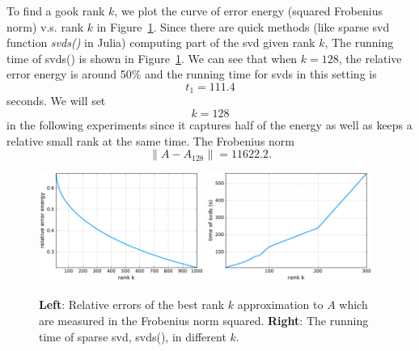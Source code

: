 To find a gook rank $k$,
we plot the curve of error energy (squared Frobenius norm) v.s. rank $k$
in Figure~\ref{fig:rank}.
Since there are quick methods (like sparse svd function \textit{svds()} in Julia)
computing part of the svd given rank $k$,
The running time of svds() is shown in Figure~\ref{fig:rank}.
We can see that when $k=128$,
the relative error energy is around 50\% and
the running time for svds in this setting is
\begin{equation}
    t_1=111.4
\end{equation}
seconds.
We will set
\begin{equation}
    k=128
\end{equation}
in the following experiments since it captures half of the energy
as well as keeps a relative small rank at the same time.
The Frobenius norm
\begin{equation}
	\| A - A_{128} \| = 11622.2.
\end{equation}

\begin{figure}[!ht]
	\centering
	\includegraphics[width=0.48\textwidth]{fig/ranks.pdf}
    \hskip 0.2cm
	\includegraphics[width=0.48\textwidth]{fig/ranks_time.pdf}
	\caption{\small
  		\textbf{Left}: Relative errors of the best rank $k$ approximation to $A$
          which are measured in the Frobenius norm squared.
        \textbf{Right}: The running time of sparse svd, svds(), in different $k$.}
	\label{fig:rank}
\end{figure}
